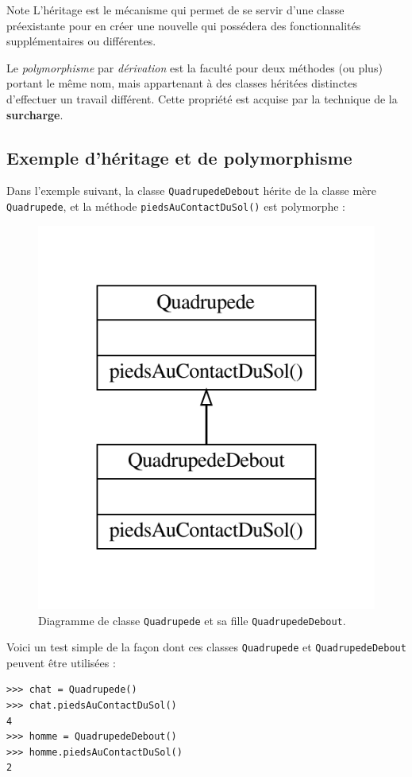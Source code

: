 \documentclass[a4paper,11pt]{article}
\theoremstyle{mytheor}
\begin{document}
\begin{bclogo}[logo=\bcinfo, couleurBarre=orange, noborder=true, couleur=orange!10]{Note}
L'héritage est le mécanisme qui permet de se servir d'une classe préexistante pour en créer une nouvelle qui possédera des fonctionnalités supplémentaires ou différentes.

Le \emph{polymorphisme} par \emph{dérivation} est la faculté pour deux méthodes (ou plus) portant le même nom, mais appartenant à des classes héritées distinctes d'effectuer un travail différent. Cette propriété est acquise par la technique de la \textbf{surcharge}.
\end{bclogo}



\subsection{Exemple d'héritage et de polymorphisme}
Dans l'exemple suivant, la classe \texttt{QuadrupedeDebout} hérite de la classe mère \texttt{Quadrupede}, et la méthode \texttt{piedsAuContactDuSol()} est polymorphe :




\begin{figure}[!ht]  %
	\centerline{\includegraphics[width=0.45\linewidth]{scripts/classes_Quadrupede.pdf}}
	\caption{
		Diagramme de classe \texttt{Quadrupede} et sa fille \texttt{QuadrupedeDebout}.
	}
\end{figure}


Voici un test simple de la façon dont ces classes \texttt{Quadrupede} et \texttt{QuadrupedeDebout} peuvent être utilisées :
\begin{Verbatim}[frame=leftline, framerule=1.5mm, rulecolor=\color{blue}]
>>> chat = Quadrupede()
>>> chat.piedsAuContactDuSol()
4
>>> homme = QuadrupedeDebout()
>>> homme.piedsAuContactDuSol()
2
\end{Verbatim}
\end{document}
